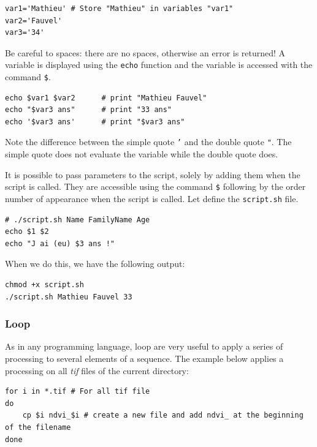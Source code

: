 \documentclass[a4paper,11pt,DIV=18]{scrartcl}
\begin{document}
\begin{verbatim}
var1='Mathieu' # Store "Mathieu" in variables "var1"
var2='Fauvel'
var3='34'
\end{verbatim}

Be  careful to  spaces: there  are no  spaces, otherwise  an error  is
returned!  A  variable is  displayed using the  \texttt{echo} function  and the
variable is accessed with the command \texttt{\$}.

\begin{verbatim}
echo $var1 $var2      # print "Mathieu Fauvel"
echo "$var3 ans"      # print "33 ans"
echo '$var3 ans'      # print "$var3 ans"
\end{verbatim}

Note the  difference between the simple  quote \texttt{'} and the  double quote
\texttt{"}. The  simple quote does not  evaluate the variable while  the double
quote does.

It is possible to pass parameters to the script, solely by adding them
when the  script is called.  They are  accessible using the  command \texttt{\$}
following by the order number of appearance when the script is
called. Let define the \texttt{script.sh} file.

\begin{verbatim}
# ./script.sh Name FamilyName Age
echo $1 $2
echo "J ai (eu) $3 ans !"
\end{verbatim}

When we do this, we have the following output:

\begin{verbatim}
chmod +x script.sh
./script.sh Mathieu Fauvel 33
\end{verbatim}

\subsubsection{Loop}
\label{sec:orgheadline46}
As in any programming language, loop are very useful to apply a series
of processing  to several  elements of a  sequence. The  example below
applies a processing on all \emph{tif} files of the current directory:

\begin{verbatim}
for i in *.tif # For all tif file
do
    cp $i ndvi_$i # create a new file and add ndvi_ at the beginning of the filename
done
\end{verbatim}
\end{document}
